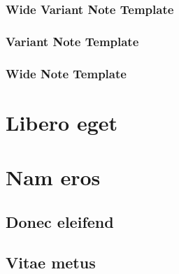 \begin{phNoteWide2}
\begin{multicols}{2}
\subsubsection*{Wide Variant Note Template}
\noindent\lipsum[11-13]
\end{multicols}
\end{phNoteWide2}

\lipsum[4-12]


\begin{phNote2}[b]
\subsubsection*{Variant Note Template}
\noindent\lipsum[106]
\end{phNote2}

\begin{phNoteWide}[b]
\begin{multicols}{2}
\subsubsection*{Wide Note Template}
\noindent\lipsum[13-14]
\end{multicols}
\end{phNoteWide}

 \lipsum[110-111]

\lipsum[112-115]

\section*{Libero eget} \lipsum[116-118]
\section*{Nam eros} \lipsum[119-120]

\subsection*{Donec eleifend} \lipsum[120-121]
\subsection*{Vitae metus} \lipsum[124-125]

